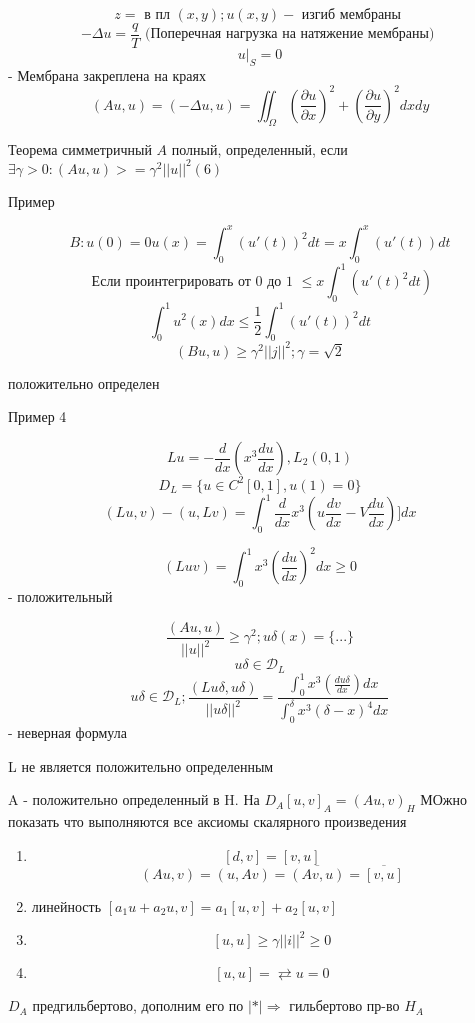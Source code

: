 \documentclass{article}
\begin{document}
\[ z = \textrm{ в пл } (x,y); u(x,y) -\textrm{ изгиб мембраны } \]
\[ - \Delta u = \frac{q}{T}\textrm{ (Поперечная нагрузка на натяжение мембраны) } \]
\[ u|_S = 0 \] - Мембрана закреплена на краях
\[ (A u , u) = (- \Delta u , u) = \iint_{\Omega} (\frac{\partial u }{\partial x })^2 + (\frac{ \partial u }{\partial y })^2 dx dy \]

Теорема 
симметричный $ A $ полный, определенный, если $ \exists \gamma > 0 : (Au, u) >= \gamma^2 {||u||}^2 (6)$

Пример

\[ B: u(0) = 0 u(x) = \int_{0}^{x } (u'(t))^2 dt = x\int_{0}^{x } (u'(t)) dt \]
\[ \textrm{ Если проинтегрировать от 0 до 1 } \leq x \int_{0}^{1} (u'(t)^2 dt) \]
\[ \int_{0}^{1} u^2 (x) dx \leq \frac{1}{2} \int_{0}^{1}(u'(t))^2 dt \]
\[ (Bu, u) \geq \gamma^2 ||j||^2; \gamma = \sqrt{2} \]

положительно определен

Пример 4 

\[ Lu = - \frac{d }{ d x } (x^3 \frac{du}{dx}), L_2 (0,1) \]
\[ D_L = \{u \in C^2[0,1], u(1) = 0 \} \]
\[(Lu, v) - (u, Lv) = \int_{0}^{1} \frac{d}{dx } x^3 (u \frac{dv }{dx }- V \frac{du }{dx })] dx \]

\[ (Lu v) = \int_{0}^{1} x^3 (\frac{du }{dx })^2 dx \geq 0 \] - положительный

\[ \frac{(Au, u)}{||u||^2} \geq \gamma^2; u\delta (x) = \{ ... \} \]
\[ u\delta \in \mathcal{D}_L  \]
\[ u\delta \in \mathcal{D}_L; \frac{(Lu\delta , u\delta)}{||u\delta||^2}  = \frac{\int_{0}^{1} x^3 (\frac{du \delta}{dx}) dx}{\int_{0}^{\delta} x^3 (\delta -x)^4 dx}\] - неверная формула

L не является положительно определенным

A - положительно определенный в H. На $ D_A [u, v]_A = {(A u, v)}_H$ 
МОжно показать что выполняются все аксиомы скалярного произведения

\begin{enumerate}
	\item \[ [d, v] = [v, u] \]
\[ (Au, v) = (u, Av) = \overline{(Av, u)} = \overline{[v, u]} \]
	\item линейность $ [a_1 u + a_2 u, v] = a_1[u, v] + a_2[u, v]$
	\item \[ [u, u] \geq \gamma ||i||^2 \geq 0 \]
	\item \[ [u, u] = \rightleftarrows u = 0 \]
\end{enumerate}

$ D_A $ предгильбертово, дополним его по $ |*| \Rightarrow $ гильбертово пр-во $ H_A $ 
\end{document}
